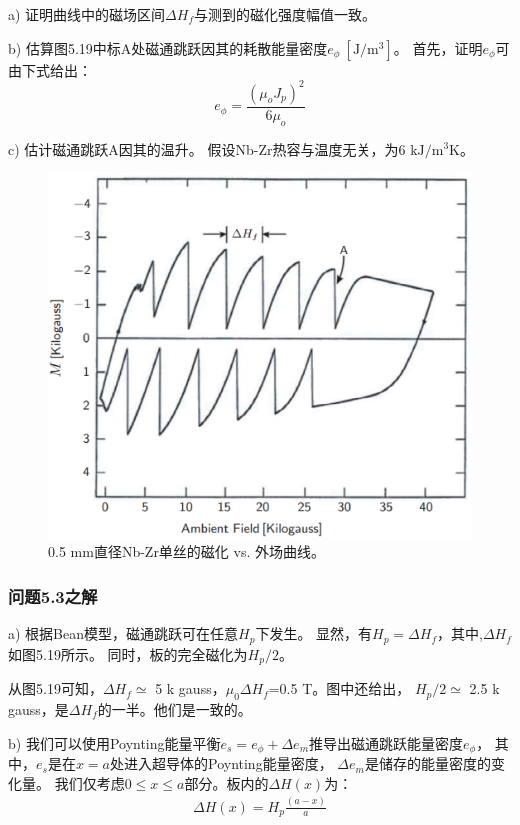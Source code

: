 a) 证明曲线中的磁场区间$\Delta H_f$与测到的磁化强度幅值一致。

b) 估算图5.19中标A处磁通跳跃因其的耗散能量密度$e_{\phi}\ [\mathrm{J/m^3}]$。
首先，证明$e_{\phi}$可由下式给出：
\begin{equation}%
e_{\phi}=\frac{(\mu_{o}J_{p})^{2}}{6\mu_{o}}
\end{equation}

c) 估计磁通跳跃A因其的温升。
假设Nb-Zr热容与温度无关，为6 $\mathrm{kJ/m^3 K}$。

\begin{figure}[htbp]
	\centering
	\includegraphics[scale=0.54]{chpt5/figs/fig5.19.eps}
	\caption{0.5 mm直径Nb-Zr单丝的磁化 vs. 外场曲线。}
\end{figure}


\subsubsection{问题5.3之解}
a) 根据Bean模型，磁通跳跃可在任意$H_p$下发生。
显然，有$H_p = \Delta H_f$，其中,$\Delta H_f$如图5.19所示。
同时，板的完全磁化为$H_p/2$。

从图5.19可知，$\Delta H_f\simeq$ 5 k gauss，$\mu_{0}\Delta H_f$=0.5 T。图中还给出，
$H_p/2\simeq$ 2.5 k gauss，是$\Delta H_f$的一半。他们是一致的。

b) 我们可以使用Poynting能量平衡$e_s=e_{\phi}+\Delta e_m$推导出磁通跳跃能量密度$e_{\phi}$，
其中，$e_s$是在$x=a$处进入超导体的Poynting能量密度， $\Delta e_m$是储存的能量密度的变化量。
我们仅考虑$0\le x\le a$部分。板内的$\Delta H(x)$为：
\begin{align*}%
\Delta H(x)=H_{p}\frac{(a-x)}{a}\tag{S3.1}
\end{align*}

